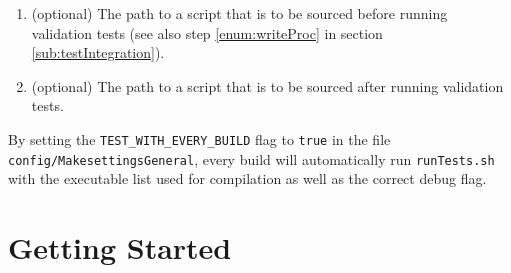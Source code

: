 \begin{description}
\begin{enumerate}
   \item (optional) The path to a script that is to be sourced before running validation tests (see also step \ref{enum:writeProc} in section \ref{sub:testIntegration}).
   \item (optional) The path to a script that is to be sourced after running validation tests.
  \end{enumerate}
  By setting the \verb|TEST_WITH_EVERY_BUILD| flag to \verb|true| in the file \verb|config/MakesettingsGeneral|, every build will automatically run \verb|runTests.sh| with the executable list used for compilation as well as the correct debug flag.
\end{description}

\section{Getting Started}
